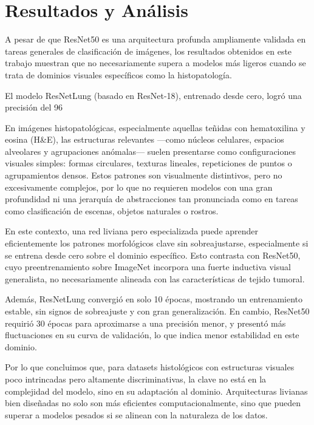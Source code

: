 \documentclass[conference]{IEEEtran}
\begin{document}
\section{Resultados y Análisis}



A pesar de que ResNet50 es una arquitectura profunda ampliamente validada en tareas generales de clasificación de imágenes, los resultados obtenidos en este trabajo muestran que no necesariamente supera a modelos más ligeros cuando se trata de dominios visuales específicos como la histopatología.

El modelo ResNetLung (basado en ResNet-18), entrenado desde cero, logró una precisión del 96 %

En imágenes histopatológicas, especialmente aquellas teñidas con hematoxilina y eosina (H&E), las estructuras relevantes —como núcleos celulares, espacios alveolares y agrupaciones anómalas— suelen presentarse como configuraciones visuales simples: formas circulares, texturas lineales, repeticiones de puntos o agrupamientos densos. Estos patrones son visualmente distintivos, pero no excesivamente complejos, por lo que no requieren modelos con una gran profundidad ni una jerarquía de abstracciones tan pronunciada como en tareas como clasificación de escenas, objetos naturales o rostros.

En este contexto, una red liviana pero especializada puede aprender eficientemente los patrones morfológicos clave sin sobreajustarse, especialmente si se entrena desde cero sobre el dominio específico. Esto contrasta con ResNet50, cuyo preentrenamiento sobre ImageNet incorpora una fuerte inductiva visual generalista, no necesariamente alineada con las características de tejido tumoral.

Además, ResNetLung convergió en solo 10 épocas, mostrando un entrenamiento estable, sin signos de sobreajuste y con gran generalización. En cambio, ResNet50 requirió 30 épocas para aproximarse a una precisión menor, y presentó más fluctuaciones en su curva de validación, lo que indica menor estabilidad en este dominio.

Por lo que concluimos que, para datasets histológicos con estructuras visuales poco intrincadas pero altamente discriminativas, la clave no está en la complejidad del modelo, sino en su adaptación al dominio. Arquitecturas livianas bien diseñadas no solo son más eficientes computacionalmente, sino que pueden superar a modelos pesados si se alinean con la naturaleza de los datos.
\end{document}
